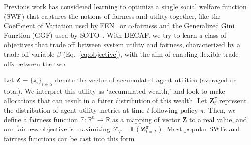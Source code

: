 Previous work has considered learning to optimize a single social welfare function (SWF) that captures the notions of fairness and utility together, like the Coefficient of Variation used by FEN~\cite{jiang2019FEN} or $\alpha$-fairness and the Generalized Gini Function (GGF) used by SOTO~\cite{zimmer2021MOMDP}. With DECAF, we try to learn a class of objectives that trade off between system utility and fairness, characterized by a trade-off variable $\beta$ (Eq.~\ref{eq:objective}), with the aim of enabling flexible trade-offs between the two. 

Let $\textbf{Z}=\{z_i\}_{i\in \alpha}$ denote the vector of accumulated agent utilities (averaged or total). We interpret this utility as `accumulated wealth,' and look to make allocations that can result in a fairer distribution of this wealth. Let $\textbf{Z}_t^\pi$ represent the distribution of agent utility metrics at time $t$ following policy $\pi$. Then, we define a fairness function $\mathbb{F}:\mathbb{R}^{n}\rightarrow \mathbb{R}$ as a mapping of vector $\textbf{Z}$ to a real value, and our fairness objective is maximizing $\mathcal{F}_T = \mathbb{F}(\textbf{Z}_{t=T}^\pi)$.  Most popular SWFs and fairness functions can be cast into this form. 

